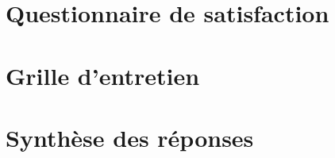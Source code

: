 \begin{appendices}
    \section{Questionnaire de satisfaction}


    \section{Grille d'entretien}


    \section{Synthèse des réponses}


\end{appendices}